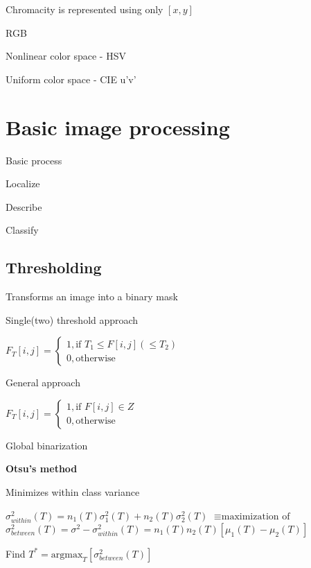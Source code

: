 \documentclass{article}
\begin{document}
\begin{multicols*}{2}
{\begin{compactitem}
		Chromacity is represented using only $[x,y]$
		\item RGB
		\item Nonlinear color space - HSV
		\item Uniform color space - CIE u'v'
	\end{compactitem}

	\section{Basic image processing}

	Basic process

	\begin{compactitem}
		\item Localize
		\item Describe
		\item Classify
	\end{compactitem}

	\subsection{Thresholding}

	Transforms an image into a binary mask

	\begin{compactitem}
		\item Single(two) threshold approach

		$F_T[i,j] = \begin{cases}
				1, \text{if } T_1 \leq F[i,j] (\leq T_2) \\
				0, \text{otherwise}
			\end{cases}$

		\item General approach

		$F_T[i,j] = \begin{cases}
				1, \text{if } F[i,j] \in Z \\
				0, \text{otherwise}
			\end{cases}$

		\item Global binarization

		\textbf{Otsu's method}

		Minimizes within class variance

		$\sigma^2_{within}(T) = n_1(T)\sigma^2_1(T) + n_2(T)\sigma^2_2(T)$
		$\equiv \text{maximization of}$
		$\sigma^2_{between}(T) = \sigma^2-\sigma^2_{within}(T) = n_1(T)n_2(T)[\mu_1(T)-\mu_2(T)]$

		Find $T^* = \text{argmax}_T[\sigma^2_{between}(T)]$


\end{compactitem}}
\end{multicols*}
\end{document}
